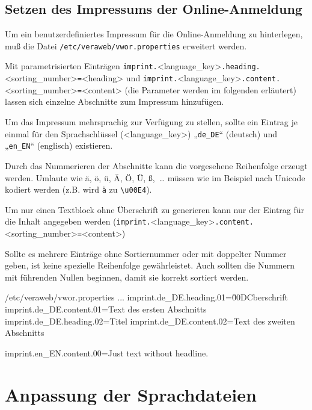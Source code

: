 \documentclass{tarentanleitung}
\begin{document}
\subsection{Setzen des Impressums der Online-Anmeldung}\label{sec:imprint-oa}

Um ein benutzerdefiniertes Impressum für die Online-Anmeldung zu hinterlegen,
muß die Datei \texttt{/etc/veraweb/vwor.properties} erweitert werden.

Mit parametrisierten Einträgen \texttt{imprint.}<language\_key>\texttt{.heading.}<sorting\_number>\texttt{=}<heading>
und \texttt{imprint.}<language\_key>\texttt{.content.}<sorting\_number>\texttt{=}<content>
(die Parameter werden im folgenden erläutert)
lassen sich einzelne Abschnitte zum Impressum hinzufügen.

Um das Impressum mehrsprachig zur Verfügung zu stellen, sollte ein Eintrag je
einmal für den Sprachschlüssel (<language\_key>) „\texttt{de\_DE}“ (deutsch)
und „\texttt{en\_EN}“ (englisch) existieren.

Durch das Nummerieren der Abschnitte kann die vorgesehene Reihenfolge erzeugt werden.
Umlaute wie ä, ö, ü, Ä, Ö, Ü, ß,~… müssen wie im Beispiel nach Unicode kodiert
werden (z.B. wird \texttt{ä} zu \texttt{\textbackslash{}u00E4}).

Um nur einen Textblock ohne Überschrift zu generieren kann nur der Eintrag
für die Inhalt angegeben werden (\texttt{imprint.}<language\_key>\texttt{.content.}<sorting\_number>\texttt{=}<content>)

Sollte es mehrere Einträge ohne Sortiernummer oder mit doppelter Nummer geben,
ist keine spezielle Reihenfolge gewährleistet. Auch sollten die Nummern mit
führenden Nullen beginnen, damit sie korrekt sortiert werden.

\begin{minipage}{\linewidth}
\begin{lstdump}{/etc/veraweb/vwor.properties}
...
imprint.de_DE.heading.01=\u00DCberschrift
imprint.de_DE.content.01=Text des ersten Abschnitts
imprint.de_DE.heading.02=Titel
imprint.de_DE.content.02=Text des zweiten Abschnitts

imprint.en_EN.content.00=Just text without headline.
\end{lstdump}
\end{minipage}

\section{Anpassung der Sprachdateien}\label{sec:l10n}
\end{document}
